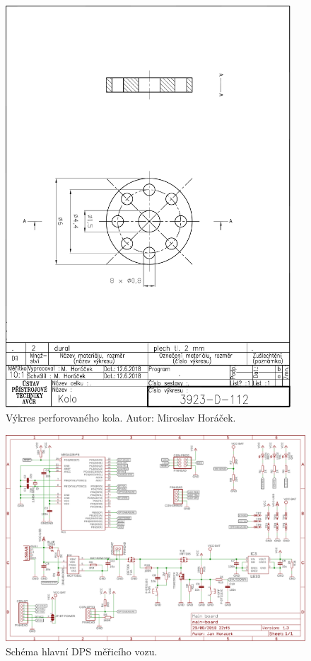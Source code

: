 \vspace{-2em}

\begin{figure}[H]
\includegraphics[width=0.95\textwidth]{data/wheel.pdf}
\caption{Výkres perforovaného kola. Autor: Miroslav Horáček.}
\label{fig:final-wheel}
\end{figure}

\begin{figure}[h]
\includegraphics[angle=90,width=\textwidth]{data/wsm_main_board_v1_3.pdf}
\caption{Schéma hlavní DPS měřicího vozu.}
\label{fig:wsm-sch}
\end{figure}
